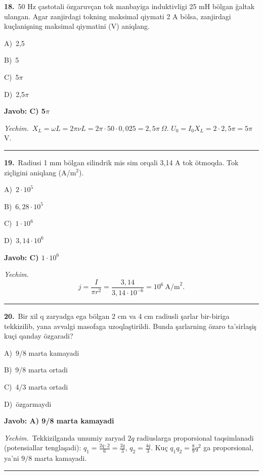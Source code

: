 \documentclass[11pt,a4paper]{article}
\newcommand{\opt}[2]{\hspace*{4mm}#1)\ #2\par}
\begin{document}
\noindent\begin{minipage}{\linewidth}
\textbf{18.}\ 50 Hz çastotali özgaruvçan tok manbayiga induktivligi 25 mH bölgan ğaltak ulangan. Agar zanjirdagi tokning maksimal qiymati 2 A bölsa, zanjirdagi kuçlanişning maksimal qiymatini (V) aniqlang.\par\smallskip
\opt{A}{2,5}
\opt{B}{5}
\opt{C}{5$\pi$}
\opt{D}{2,5$\pi$}
\end{minipage}\vspace{2pt}\par
\noindent\colorbox{gray!12}{\parbox{\dimexpr\linewidth-2\fboxsep}{\textbf{Javob: C) 5$\pi$}}}\par\smallskip
\noindent\textit{Yechim.}\ $X_L=\omega L=2\pi\nu L=2\pi\cdot50\cdot0{,}025=2{,}5\pi\ \Omega$. $U_0=I_0X_L=2\cdot2{,}5\pi=5\pi$ V.\par\par\medskip\hrule\medskip
{}\noindent\begin{minipage}{\linewidth}
\textbf{19.}\ Radiusi 1 mm bölgan silindrik mis sim orqali 3,14 A tok ötmoqda. Tok ziçligini aniqlang (A/m$^{2}$).\par\smallskip
\opt{A}{$2\cdot10^5$}
\opt{B}{$6{,}28\cdot10^5$}
\opt{C}{$1\cdot10^6$}
\opt{D}{$3{,}14\cdot10^6$}
\end{minipage}\vspace{2pt}\par
\noindent\colorbox{gray!12}{\parbox{\dimexpr\linewidth-2\fboxsep}{\textbf{Javob: C) $1\cdot10^6$}}}\par\smallskip
\noindent\textit{Yechim.}\ \[j=\frac{I}{\pi r^2}=\frac{3{,}14}{3{,}14\cdot10^{-6}}=10^6\ \text{A/m}^2.\]\par\medskip\hrule\medskip
{}\noindent\begin{minipage}{\linewidth}
\textbf{20.}\ Bir xil q zaryadga ega bölgan 2 cm va 4 cm radiusli şarlar bir-biriga tekkizilib, yana avvalgi masofaga uzoqlaştirildi. Bunda şarlarning özaro ta’sirlaşiş kuçi qanday özgaradi?\par\smallskip
\opt{A}{9/8 marta kamayadi}
\opt{B}{9/8 marta ortadi}
\opt{C}{4/3 marta ortadi}
\opt{D}{özgarmaydi}
\end{minipage}\vspace{2pt}\par
\noindent\colorbox{gray!12}{\parbox{\dimexpr\linewidth-2\fboxsep}{\textbf{Javob: A) 9/8 marta kamayadi}}}\par\smallskip
\noindent\textit{Yechim.}\ Tekkizilganda umumiy zaryad $2q$ radiuslarga proporsional taqsimlanadi (potensiallar tenglaşadi): $q_1=\frac{2q\cdot2}{6}=\frac{2q}{3}$, $q_2=\frac{4q}{3}$. Kuç $q_1q_2=\frac{8}{9}q^2$ ga proporsional, ya’ni $9/8$ marta kamayadi.\par\par\medskip\hrule\medskip
\end{document}
